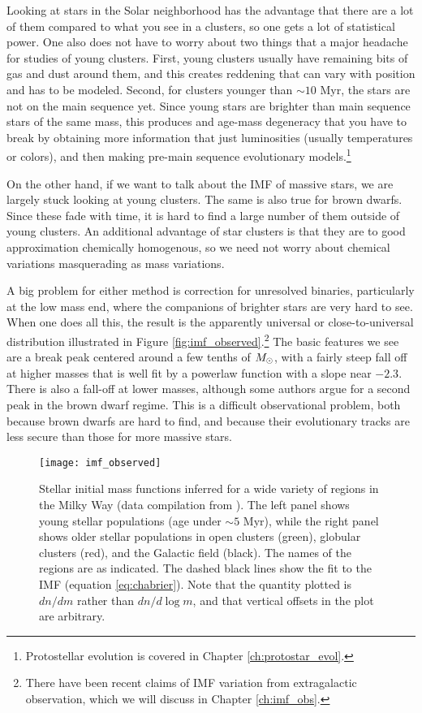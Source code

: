Looking at stars in the Solar neighborhood has the advantage that there are a lot of them compared to what you see in a clusters, so one gets a lot of statistical power. One also does not have to worry about two things that a major headache for studies of young clusters. First, young clusters usually have remaining bits of gas and dust around them, and this creates reddening that can vary with position and has to be modeled. Second, for clusters younger than $\sim 10$ Myr, the stars are not on the main sequence yet. Since young stars are brighter than main sequence stars of the same mass, this produces and age-mass degeneracy that you have to break by obtaining more information that just luminosities (usually temperatures or colors), and then making pre-main sequence evolutionary models.\footnote{Protostellar evolution is covered in Chapter \ref{ch:protostar_evol}.}

On the other hand, if we want to talk about the IMF of massive stars, we are largely stuck looking at young clusters. The same is also true for brown dwarfs. Since these fade with time, it is hard to find a large number of them outside of young clusters. An additional advantage of star clusters is that they are to good approximation chemically homogenous, so we need not worry about chemical variations masquerading as mass variations.

A big problem for either method is correction for unresolved binaries, particularly at the low mass end, where the companions of brighter stars are very hard to see. When one does all this, the result is the apparently universal or close-to-universal distribution illustrated in Figure \ref{fig:imf_observed}.\footnote{There have been recent claims of IMF variation from extragalactic observation, which we will discuss in Chapter \ref{ch:imf_obs}.} The basic features we see are a break peak centered around a few tenths of $M_{\odot}$, with a fairly steep fall off at higher masses that is well fit by a powerlaw function with a slope near $-2.3$. There is also a fall-off at lower masses, although some authors argue for a second peak in the brown dwarf regime. This is a difficult observational problem, both because brown dwarfs are hard to find, and because their evolutionary tracks are less secure than those for more massive stars.

\begin{figure}
\texttt{[image: imf\_observed]}
\caption[Measured stellar IMFs in a variety of regions]{
\label{fig:imf_bastian10}
Stellar initial mass functions inferred for a wide variety of regions in the Milky Way (data compilation from \citealt{bastian10a}). The left panel shows young stellar populations (age under $\sim 5$ Myr), while the right panel shows older stellar populations in open clusters (green), globular clusters (red), and the Galactic field (black). The names of the regions are as indicated. The dashed black lines show the \citet{chabrier05a} fit to the IMF (equation \ref{eq:chabrier}). Note that the quantity plotted is $dn/dm$ rather than $dn/d\log m$, and that vertical offsets in the plot are arbitrary.
}
\end{figure}


